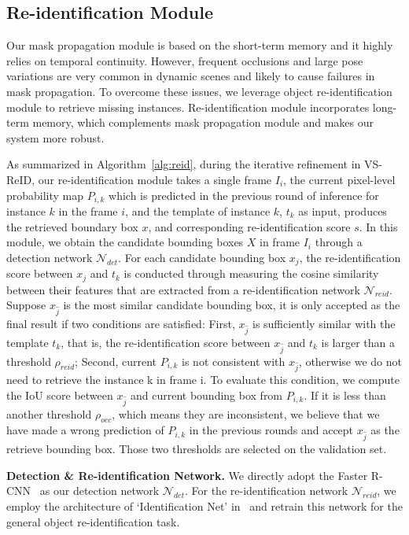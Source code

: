 \subsection{Re-identification Module}
\label{sec:re_identification_module}
Our mask propagation module is based on the short-term memory and it highly relies on temporal continuity.
%
However, frequent occlusions and large pose variations are very common in dynamic scenes and likely to cause failures in mask propagation.
%
To overcome these issues, we leverage object re-identification module to retrieve missing instances.
%
Re-identification module incorporates long-term memory, which complements mask propagation module and makes our system more robust.

As summarized in Algorithm~\ref{alg:reid}, during the iterative refinement in VS-ReID, our re-identification module takes a single frame $I_i$, the current pixel-level probability map $P_{i, k}$ which is predicted in the previous round of inference for instance $k$ in the frame $i$, and the template of instance $k$, $t_k$ as input, produces the retrieved boundary box $x$, and corresponding re-identification score $s$.
%
In this module, we obtain the candidate bounding boxes $X$ in frame $I_i$ through a detection network $\mathcal{N}_{det}$.
%
For each candidate bounding box $x_j$, the re-identification score between $x_j$ and $t_k$ is conducted through measuring the cosine similarity between their features that are extracted from a re-identification network $\mathcal{N}_{reid}$.
%
Suppose $x_{\hat{j}}$ is the most similar candidate bounding box, it is only accepted as the final result if two conditions are satisfied:
%	
First, $x_{\hat{j}}$ is sufficiently similar with the template $t_k$, that is, the re-identification score between $x_{\hat{j}}$ and $t_k$ is larger than a threshold $\rho_{reid}$;
%
Second, current $P_{i, k}$ is not consistent with $x_{\hat{j}}$, otherwise we do not need to retrieve the instance k in frame i.
%
To evaluate this condition, we compute the IoU score between $x_{\hat{j}}$ and current bounding box from $P_{i, k}$.
%
If it is less than another threshold $\rho_{occ}$, which means they are inconsistent, we believe that we have made a wrong prediction of $P_{i, k}$ in the previous rounds and accept $x_{\hat{j}}$ as the retrieve bounding box.
%
Those two thresholds are selected on the validation set.

\noindent
\textbf{Detection \& Re-identification Network.}
%
We directly adopt the Faster R-CNN~\cite{renNIPS15fasterrcnn} as our detection network $\mathcal{N}_{det}$.
%
For the re-identification network $\mathcal{N}_{reid}$, we employ the architecture of `Identification Net' in~\cite{xiaoli2017joint} and retrain this network for the general object re-identification task. 


